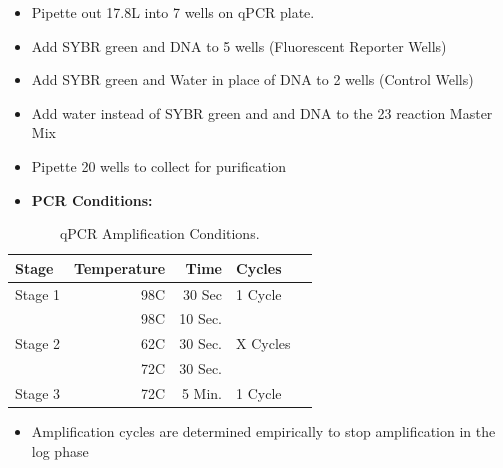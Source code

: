 \documentclass[a4paper]{article}
\begin{document}
        \begin{itemize}
			
            \item Pipette out 17.8\textmu L into 7 wells on qPCR plate. 
        	
            \item Add SYBR green and DNA to 5 wells (Fluorescent Reporter Wells)
           	
            \item Add SYBR green and Water in place of DNA to 2 wells (Control Wells)

			\item Add water instead of SYBR green and and DNA to the 23 reaction Master Mix
            
        	\item Pipette 20 wells to collect for purification 

           	\item \textbf{PCR Conditions:}
            	\end{itemize}
         \FloatBarrier
         \begin{table}[H]
			\centering
			\begin{tabular}{l|r|r|l|r}
				Stage 	& 	Temperature	&	Time	&	Cycles		\\\hline
				Stage 1	&	98C			&	30 Sec	&	1 Cycle		\\\hline
						&	98C			&	10 Sec.	&				\\
                Stage 2	&	62C			&	30 Sec.	&	X Cycles	\\
                  		&	72C			&	30 Sec.	&				\\\hline
                Stage 3	&	72C			&	5 Min.	&	1 Cycle		\\
				\end{tabular}
           		\caption{\label{LibqPCRPCR}qPCR Amplification Conditions.}
          \end{table}
            
        \begin{itemize}
        	
            \item Amplification cycles are determined empirically to stop amplification in the log phase
        
        \end{itemize}
        
\end{document}

